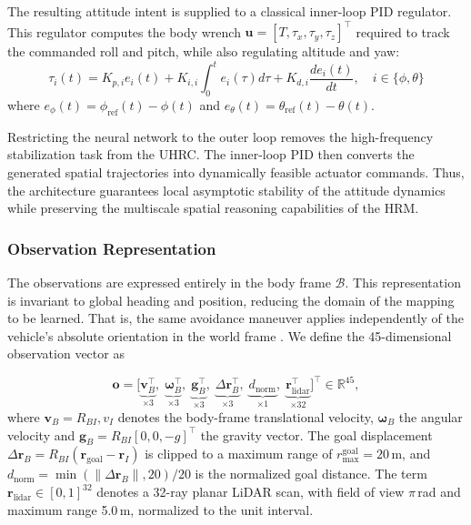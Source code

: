 \documentclass[12pt, a4paper]{article}
\begin{document}
The resulting attitude intent is supplied to a classical inner-loop PID regulator.
This regulator computes the body wrench $\mathbf{u} = [T, \tau_x, \tau_y, \tau_z]^{\top}$ required to track the commanded roll and pitch, while also regulating altitude and yaw:
\begin{equation}
    \tau_i(t) = K_{p,i} e_i(t) + K_{i,i} \int_{0}^{t} e_i(\tau) d\tau + K_{d,i} \frac{d e_i(t)}{dt}, \quad i \in \{\phi, \theta\}
\end{equation}
where $e_\phi(t) = \phi_{\mathrm{ref}}(t) - \phi(t)$ and $e_\theta(t) = \theta_{\mathrm{ref}}(t) - \theta(t)$. 

Restricting the neural network to the outer loop removes the high-frequency stabilization task from the UHRC.
The inner-loop PID then converts the generated spatial trajectories into dynamically feasible actuator commands.
Thus, the architecture guarantees local asymptotic stability of the attitude dynamics while preserving the multiscale spatial reasoning capabilities of the HRM.


\subsubsection{Observation Representation}
\label{sec:obs}

The observations are expressed entirely in the body frame $\mathcal{B}$.
This representation is invariant to global heading and position, reducing the domain of the mapping to be learned.
That is, the same avoidance maneuver applies independently of the vehicle's absolute orientation in the world frame \parencite{liang_nonlinear_2018}.
We define the 45-dimensional observation vector as

\begin{equation}
    \mathbf{o} =
    \bigl[
        \underbrace{\mathbf{v}_B^{\top}}_{\times 3},\;
        \underbrace{\boldsymbol{\omega}_B^{\top}}_{\times 3},\;
        \underbrace{\mathbf{g}_B^{\top}}_{\times 3},\;
        \underbrace{\Delta\mathbf{r}_B^{\top}}_{\times 3},\;
        \underbrace{d_{\mathrm{norm}}}_{\times 1},\;
        \underbrace{\mathbf{r}_{\mathrm{lidar}}^{\top}}_{\times 32}
    \bigr]^{\top}
    \in \mathbb{R}^{45},
    \label{eq:obs}
\end{equation}
where $\mathbf{v}_B = R_{BI}\mathbf, {v}_I$ denotes the body-frame translational velocity, $\boldsymbol{\omega}_B$ the angular velocity and $\mathbf{g}_B = R_{BI}[0, 0, -g]^{\top}$ the gravity vector.
The goal displacement $\Delta\mathbf{r}_B = R_{BI}(\mathbf{r}_{\mathrm{goal}} - \mathbf{r}_I)$ is clipped to a maximum range of $r_{\max}^{\mathrm{goal}} = 20$\,m, and $d_{\mathrm{norm}} = \min(\|\Delta\mathbf{r}_B\|, 20) / 20$ is the normalized goal distance.
The term $\mathbf{r}_{\mathrm{lidar}} \in [0, 1]^{32}$ denotes a 32-ray planar LiDAR scan, with field of view $\pi$\,rad and maximum range 5.0\,m, normalized to the unit interval.
\end{document}
